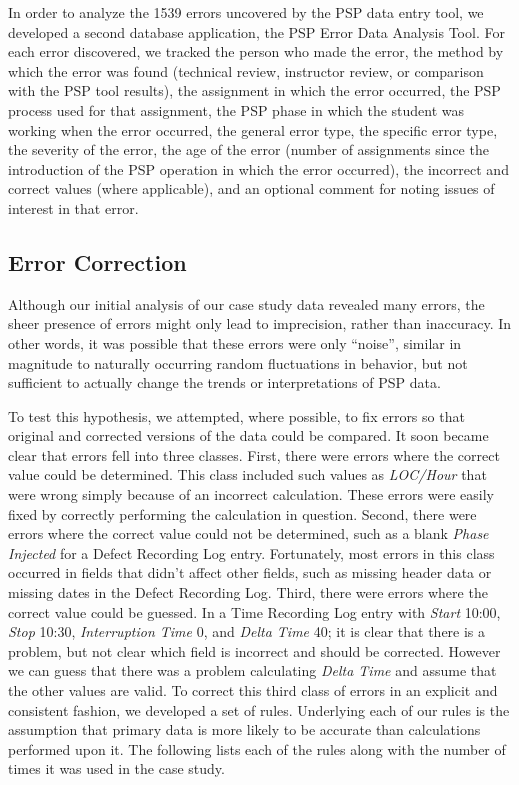   In order to analyze the 1539 errors uncovered by the PSP data entry tool,
  we developed a second database application, the PSP Error Data Analysis
  Tool.  For each error discovered, we tracked the person who made the
  error, the method by which the error was found (technical review,
  instructor review, or comparison with the PSP tool results), the
  assignment in which the error occurred, the PSP process used for that
  assignment, the PSP phase in which the student was working when the error
  occurred, the general error type, the specific error type, the severity
  of the error, the age of the error (number of assignments since the
  introduction of the PSP operation in which the error occurred), the
  incorrect and correct values (where applicable), and an optional comment
  for noting issues of interest in that error.

  \subsection{Error Correction}
  
  Although our initial analysis of our case study data revealed many
  errors, the sheer presence of errors might only lead to imprecision,
  rather than inaccuracy. In other words, it was possible that these errors
  were only ``noise'', similar in magnitude to naturally occurring random
  fluctuations in behavior, but not sufficient to actually change the
  trends or interpretations of PSP data.
 
  To test this hypothesis, we attempted, where possible, to fix errors so
  that original and corrected versions of the data could be compared.  It
  soon became clear that errors fell into three classes.  First, there were
  errors where the correct value could be determined.  This class included
  such values as {\it LOC/Hour} that were wrong simply because of an
  incorrect calculation. These errors were easily fixed by correctly
  performing the calculation in question.  Second, there were errors where
  the correct value could not be determined, such as a blank {\it Phase
    Injected} for a Defect Recording Log entry.  Fortunately, most errors
  in this class occurred in fields that didn't affect other fields, such as
  missing header data or missing dates in the Defect Recording Log.  Third,
  there were errors where the correct value could be guessed.  In a Time
  Recording Log entry with {\it Start} 10:00, {\it Stop} 10:30, {\it
    Interruption Time} 0, and {\it Delta Time} 40; it is clear that there
  is a problem, but not clear which field is incorrect and should be
  corrected.  However we can guess that there was a problem calculating
  {\it Delta Time} and assume that the other values are valid.  To correct
  this third class of errors in an explicit and consistent fashion, we
  developed a set of rules.  Underlying each of our rules is the assumption
  that primary data is more likely to be accurate than calculations
  performed upon it. The following lists each of the rules along with
  the number of times it was used in the case study.
      
